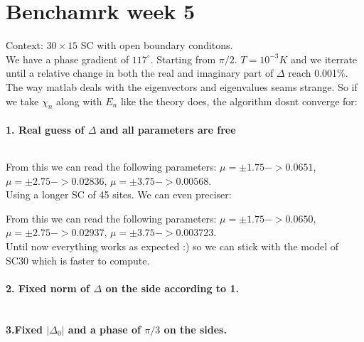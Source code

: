 \documentclass[../main.tex]{subfiles}
\begin{document}
\section{Benchamrk week 5}
Context: $30\times 15$ SC with open boundary conditons.\\

We have a phase gradient of $117^{\circ}$. Starting from $\pi/2$. $T=10^{-3}K$ and we iterrate until a relative
change in both the real and imaginary part of $\Delta$ reach 0.001\%. \\

The way matlab deals with the eigenvectors and eigenvalues seams strange. So if we take $\chi_n$ along with $E_n$
like the theory does, the algorithm dosnt converge for: 
\paragraph{1. Real guess of $\Delta$ and all parameters are free}$~$\\
\begin{figure}[H]
    \centering
    
    \caption{}
\end{figure}
From this we can read the following parameters: $\mu = \pm 1.75 -> 0.0651$, $\mu = \pm 2.75 -> 0.02836$, $\mu = \pm 3.75 -> 0.00568$.
\\
Using a longer SC of 45 sites. We can even preciser:
\begin{figure}[H]
    \centering
    
    \caption{}
\end{figure}
From this we can read the following parameters: $\mu = \pm 1.75 -> 0.0650$, $\mu = \pm 2.75 -> 0.02937$, $\mu = \pm 3.75 -> 0.003723$.
\\
Until now everything works as expected :) so we can stick with the model of SC30 which is faster to compute.\\

\paragraph{2. Fixed norm of $\Delta$ on the side according to 1.}$~$\\
\begin{figure}[H]
    \centering
    
    \caption{}
\end{figure}

\paragraph{3.Fixed $|\Delta_0|$ and a phase of $\pi/3$ on the sides.}$~$\\
\begin{figure}[H]
    \centering
    
    \caption{}
\end{figure}
\end{document}
